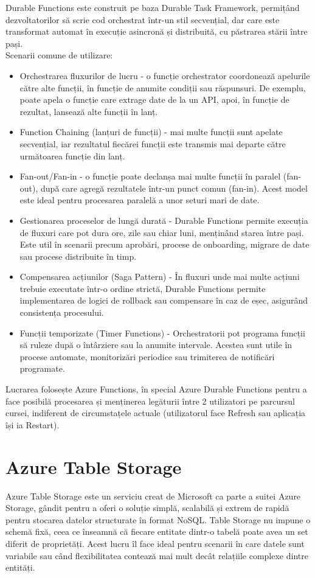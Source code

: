 Durable Functions este construit pe baza Durable Task Framework, permițând dezvoltatorilor să scrie cod orchestrat într-un stil secvențial, dar care este transformat automat în execuție asincronă și distribuită, cu păstrarea stării între pași. \parencite{azureDurableFunctions}
\\Scenarii comune de utilizare:
\begin{itemize}
    \item Orchestrarea fluxurilor de lucru - o funcție orchestrator coordonează apelurile către alte funcții, în funcție de anumite condiții sau răspunsuri. De exemplu, poate apela o funcție care extrage date de la un API, apoi, în funcție de rezultat, lansează alte funcții în lanț.
    \item 	Function Chaining (lanțuri de funcții) - mai multe funcții sunt apelate secvențial, iar rezultatul fiecărei funcții este transmis mai departe către următoarea funcție din lanț.
    \item 	Fan-out/Fan-in - o funcție poate declanșa mai multe funcții în paralel (fan-out), după care agregă rezultatele într-un punct comun (fan-in). Acest model este ideal pentru procesarea paralelă a unor seturi mari de date.
    \item 	Gestionarea proceselor de lungă durată - Durable Functions permite execuția de fluxuri care pot dura ore, zile sau chiar luni, menținând starea între pași. Este util în scenarii precum aprobări, procese de onboarding, migrare de date sau procese distribuite în timp.
    \item 	Compensarea acțiunilor (Saga Pattern) - În fluxuri unde mai multe acțiuni trebuie executate într-o ordine strictă, Durable Functions permite implementarea de logici de rollback sau compensare în caz de eșec, asigurând consistența procesului.
    \item 	Funcții temporizate (Timer Functions) - Orchestratorii pot programa funcții să ruleze după o întârziere sau la anumite intervale. Acestea sunt utile în procese automate, monitorizări periodice sau trimiterea de notificări programate.
\end{itemize}\parencite{azureDurableFunctions}

Lucrarea folosește Azure Functions, în special Azure Durable Functions pentru a face posibilă procesarea și menținerea legăturii între 2 utilizatori pe parcursul cursei, indiferent de circumstațele actuale (utilizatorul face Refresh sau aplicația își ia Restart).

\section{Azure Table Storage}
Azure Table Storage este un serviciu creat de Microsoft ca parte a suitei Azure Storage, gândit pentru a oferi o soluție simplă, scalabilă și extrem de rapidă pentru stocarea datelor structurate în format NoSQL. Table Storage nu impune o schemă fixă, ceea ce înseamnă că fiecare entitate dintr-o tabelă poate avea un set diferit de proprietăți. Acest lucru îl face ideal pentru scenarii în care datele sunt variabile sau când flexibilitatea contează mai mult decât relațiile complexe dintre entități. \parencite{azureStorage}

